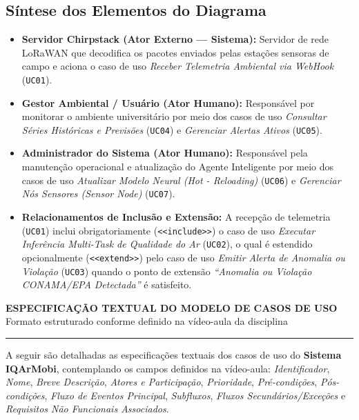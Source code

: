 \documentclass[11pt, a4paper]{article}
\begin{document}
\subsection*{Síntese dos Elementos do Diagrama}
\begin{itemize}[nosep, leftmargin=0.6cm]
    \item \textbf{Servidor Chirpstack (Ator Externo --- Sistema):} Servidor de rede LoRaWAN que decodifica os pacotes enviados pelas estações sensoras de campo e aciona o caso de uso \emph{Receber Telemetria Ambiental via WebHook} (\texttt{UC01}).
    \item \textbf{Gestor Ambiental / Usuário (Ator Humano):} Responsável por monitorar o ambiente universitário por meio dos casos de uso \emph{Consultar Séries Históricas e Previsões} (\texttt{UC04}) e \emph{Gerenciar Alertas Ativos} (\texttt{UC05}).
    \item \textbf{Administrador do Sistema (Ator Humano):} Responsável pela manutenção operacional e atualização do Agente Inteligente por meio dos casos de uso \emph{Atualizar Modelo Neural (Hot - Reloading)} (\texttt{UC06}) e \emph{Gerenciar Nós Sensores (Sensor Node)} (\texttt{UC07}).
    \item \textbf{Relacionamentos de Inclusão e Extensão:} A recepção de telemetria (\texttt{UC01}) inclui obrigatoriamente (\texttt{<<include>>}) o caso de uso \emph{Executar Inferência Multi-Task de Qualidade do Ar} (\texttt{UC02}), o qual é estendido opcionalmente (\texttt{<<extend>>}) pelo caso de uso \emph{Emitir Alerta de Anomalia ou Violação} (\texttt{UC03}) quando o ponto de extensão \emph{``Anomalia ou Violação CONAMA/EPA Detectada''} é satisfeito.
\end{itemize}

\newpage

\begin{center}
    {\Large\bfseries ESPECIFICAÇÃO TEXTUAL DO MODELO DE CASOS DE USO}\\[0.1cm]
    {\normalsize Formato estruturado conforme definido na vídeo-aula da disciplina}
    \vspace{0.1cm}
    \hrule
\end{center}

\vspace{0.15cm}

A seguir são detalhadas as especificações textuais dos casos de uso do \textbf{Sistema IQArMobi}, contemplando os campos definidos na vídeo-aula: \emph{Identificador}, \emph{Nome}, \emph{Breve Descrição}, \emph{Atores e Participação}, \emph{Prioridade}, \emph{Pré-condições}, \emph{Pós-condições}, \emph{Fluxo de Eventos Principal}, \emph{Subfluxos}, \emph{Fluxos Secundários/Exceções} e \emph{Requisitos Não Funcionais Associados}.
\end{document}
